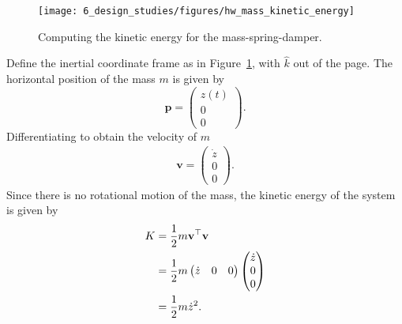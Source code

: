 
\begin{figure}[H]
   \centering
   \texttt{[image: 6\_design\_studies/figures/hw\_mass\_kinetic\_energy]} 
   \caption{Computing the kinetic energy for the mass-spring-damper.}
   \label{fig:hw_mass_kinetic_energy}
\end{figure}
Define the inertial coordinate frame as in Figure~\ref{fig:hw_mass_kinetic_energy}, with $\hat{k}$ out of the page.  The horizontal position of the mass $m$ is given by 
\[
\mathbf{p} = \begin{pmatrix} z(t) \\ 0 \\ 0 \end{pmatrix}.
\]
Differentiating to obtain the velocity of $m$ 
\begin{align*}
\mathbf{v} = \begin{pmatrix}  \dot{z} \\ 0 \\ 0 \end{pmatrix}.
\end{align*}
Since there is no rotational motion of the mass, the 
kinetic energy of the system is given by
\begin{align}
K &= \frac{1}{2}m\mathbf{v}^\top\mathbf{v} \notag\\
  &= \frac{1}{2}m\begin{pmatrix} \dot{z} & 0 & 0 \end{pmatrix} \begin{pmatrix} \dot{z} \\ 0 \\ 0 \end{pmatrix} \notag\\
  &= \frac{1}{2}m\dot{z}^2.
  \label{eq:mass_kinetic_energy}
\end{align}





